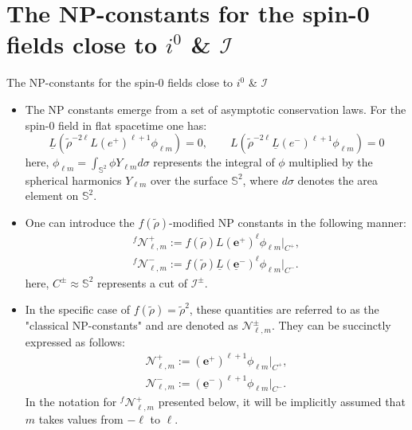 \documentclass{beamer}
\theoremstyle{remark}
\theoremstyle{plain}
\theoremstyle{plain}
\begin{document}
\section{The NP-constants for the spin-0 fields close to $i^0$ \& $\mathscr{I}$}
\begin{frame}{The NP-constants for the spin-0 fields close to $i^0$ \& $\mathscr{I}$}
  \begin{itemize}
    \item The NP constants emerge from a set of asymptotic conservation laws. For the spin-0 field in flat spacetime one has:
    \begin{equation}\label{eq:cons_laws}
      {\underline{{L}}}({\tilde{\rho}}^{-2\ell}L(e^{+})^{\ell+1}\phi_{\ell m})=0, \qquad L({\tilde{\rho}}^{-2\ell}\underline{L}(e^{-})^{\ell+1}\phi_{\ell m})=0
    \end{equation}
    here, $\phi_{\ell m}= \int_{\mathbb{S}^2} \phi  Y_{\ell m}  d\sigma$ represents the integral of $\phi$ multiplied by the spherical harmonics $Y_{\ell m}$ over the surface $\mathbb{S}^2$, where $d\sigma$ denotes the area element on $\mathbb{S}^2$.
    \item One can introduce the $f(\tilde{\rho})$-modified NP constants in the following manner: 
    \begin{align}\label{eq:DefModifiedNP}
      {}^{f}\mathcal{N}^{+}_{\ell,m}:= f(\tilde{\rho})L (\boldsymbol{e}^{+})^{\ell}\phi_{\ell m} \Big|_{{C}^{+}}, \\ 
      {}^{f}\mathcal{N}^{-}_{\ell,m}:= f(\tilde{\rho})\underline{L} (\boldsymbol{\underline{e}}^{-})^{\ell}\phi_{\ell m}\Big|_{{C}^{-}}.
    \end{align}
    here, ${C^{\pm}} \approx \mathbb{S}^2$ represents a cut of $\mathscr{I}^{\pm}$.
  \end{itemize}
\end{frame}
  
\begin{frame}
  \begin{itemize}
    \item In the specific case of $f(\tilde{\rho})=\tilde{\rho}^2$, these quantities are referred to as the "classical NP-constants" and are denoted as $\mathcal{N}^{\pm}_{\ell,m}$. They can be succinctly expressed as follows:
    \begin{align}\label{eq:classicalNP}
      \mathcal{N}^{+}_{\ell,m}:= (\boldsymbol{e}^{+})^{\ell+1}\phi_{\ell m}\Big|_{{C}^{+}},\\ 
      \mathcal{N}^{-}_{\ell,m}:= (\boldsymbol{\underline{e}}^{-})^{\ell+1}\phi_{\ell m} \Big|_{{C}^{-}}.
    \end{align}
    In the notation for ${}^{f}\mathcal{N}^{+}_{\ell,m}$ presented below, it will be implicitly assumed that $m$ takes values from $-\ell$ to $\ell$.
  \end{itemize}
\end{frame}
\end{document}
